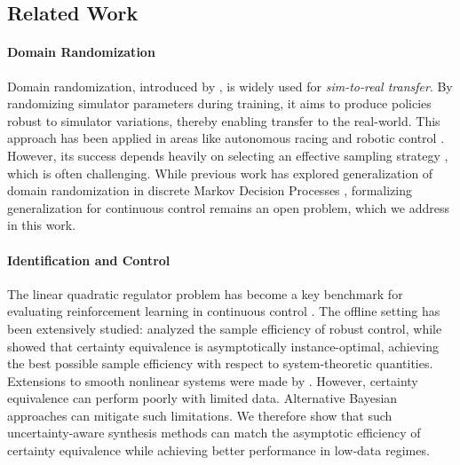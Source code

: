 \subsection{Related Work}

\paragraph{Domain Randomization} 
Domain randomization, introduced by \citet{tobin2017dr}, is widely used for \emph{sim-to-real transfer}. By randomizing simulator parameters during training, it aims to produce policies robust to simulator variations, thereby enabling transfer to the real-world. This approach has been applied in areas like autonomous racing \citep{loquercio2019deep}
and robotic control \citep{peng2018drforcontrol, akkaya2019solving}. However, its success depends heavily on selecting an effective sampling strategy \citep{mehta2020active}, which is often challenging. While previous work has explored generalization of domain randomization in discrete Markov Decision Processes \citep{chen2021understanding, zhong2019pacreinforcementlearningrealworld, jiang2018pac}, formalizing generalization for continuous control remains an open problem, which we address in this work.
\vspace{-3pt}
\paragraph{Identification and Control} The linear quadratic regulator problem has become a key benchmark for evaluating reinforcement learning in continuous control \citep{abbasi2011regret, recht2019tour}. The offline setting has been extensively studied: \citet{dean2020sample} analyzed the sample efficiency of robust control, while \citet{mania2019certainty, wagenmaker2021task, lee2023fundamental} showed that certainty equivalence is asymptotically instance-optimal, achieving the best possible sample efficiency with respect to system-theoretic quantities. Extensions to smooth nonlinear systems were made by \citet{wagenmaker2024optimal, lee2024active}. However, certainty equivalence can perform poorly with limited data. Alternative Bayesian approaches \citep{von2022improving, chiuso2023harnessing} can mitigate such limitations. We therefore show that such uncertainty-aware synthesis methods can match the asymptotic efficiency of certainty equivalence while achieving better performance in low-data regimes.
\vspace{-3pt}

